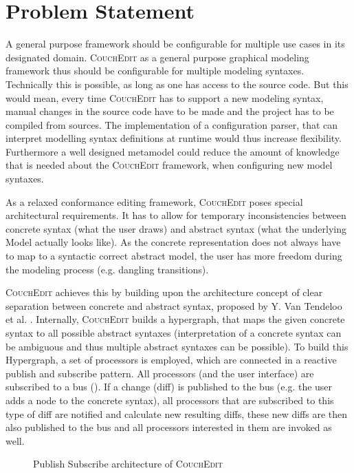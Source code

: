 \section{Problem Statement}
\label{sec:problem_statement}

A general purpose framework should be configurable for multiple use cases in its designated domain. \textsc{CouchEdit} as a general purpose graphical modeling framework thus should be configurable for multiple modeling syntaxes. Technically this is possible, as long as one has access to the source code. But this would mean, every time \textsc{CouchEdit} has to support a new modeling syntax, manual changes in the source code have to be made and the project has to be compiled from sources. The implementation of a configuration parser, that can interpret modelling syntax definitions at runtime would thus increase flexibility. Furthermore a well designed metamodel could reduce the amount of knowledge that is needed about the \textsc{CouchEdit} framework, when configuring new model syntaxes.

As a relaxed conformance editing framework, \textsc{CouchEdit} poses special architectural requirements. It has to allow for temporary inconsistencies between concrete syntax (what the user draws) and abstract syntax (what the underlying Model actually looks like). As the concrete representation does not always have to map to a syntactic correct abstract model, the user has more freedom during the modeling process (e.g. dangling transitions).

\textsc{CouchEdit} achieves this by building upon the architecture concept of clear separation between concrete and abstract syntax, proposed by Y. Van Tendeloo et al. \cite{van_tendeloo_concrete_2017}. Internally, \textsc{CouchEdit} builds a hypergraph, that maps the given concrete syntax to all possible abstract syntaxes (interpretation of a concrete syntax can be ambiguous and thus multiple abstract syntaxes can be possible). To build this Hypergraph, a set of processors is employed, which are connected in a reactive publish and subscribe pattern. All processors (and the user interface) are subscribed to a bus (). If a change (diff) is published to the bus (e.g. the user adds a node to the concrete syntax), all processors that are subscribed to this type of diff are notified and calculate new resulting diffs, these new diffs are then also published to the bus and all processors interested in them are invoked as well.

\begin{figure}
  \centering
  
  \caption{Publish Subscribe architecture of \textsc{CouchEdit}}
  \label{fig:processors}
\end{figure}

